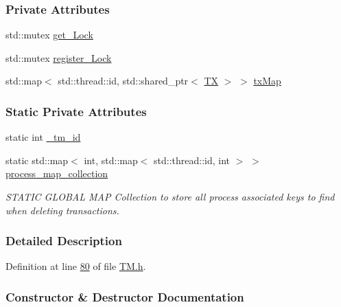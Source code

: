 \subsubsection*{Private Attributes}
\begin{DoxyCompactItemize}
\item 
std\+::mutex \hyperlink{class_t_m_a123bc5aa0766a7b909bebc54a429e5b0_a123bc5aa0766a7b909bebc54a429e5b0}{get\+\_\+\+Lock}
\item 
std\+::mutex \hyperlink{class_t_m_aeb26546681bfe64e21606b8c012bb8c3_aeb26546681bfe64e21606b8c012bb8c3}{register\+\_\+\+Lock}
\item 
std\+::map$<$ std\+::thread\+::id, std\+::shared\+\_\+ptr$<$ \hyperlink{class_t_x}{TX} $>$ $>$ \hyperlink{class_t_m_a0333dfa193ea99d7626de74a2b932e9b_a0333dfa193ea99d7626de74a2b932e9b}{tx\+Map}
\end{DoxyCompactItemize}
\subsubsection*{Static Private Attributes}
\begin{DoxyCompactItemize}
\item 
static int \hyperlink{class_t_m_a6fb90615393f9205838e302c714bbd60_a6fb90615393f9205838e302c714bbd60}{\+\_\+tm\+\_\+id}
\item 
static std\+::map$<$ int, std\+::map$<$ std\+::thread\+::id, int $>$ $>$ \hyperlink{class_t_m_a81c3bd28ad2343a620fa070f8ac186ca_a81c3bd28ad2343a620fa070f8ac186ca}{process\+\_\+map\+\_\+collection}
\begin{DoxyCompactList}\small\item\em S\+T\+A\+T\+IC G\+L\+O\+B\+AL M\+AP Collection to store all process associated keys to find when deleting transactions. \end{DoxyCompactList}\end{DoxyCompactItemize}


\subsubsection{Detailed Description}


Definition at line \hyperlink{_t_m_8h_source_l00080}{80} of file \hyperlink{_t_m_8h_source}{T\+M.\+h}.



\subsubsection{Constructor \& Destructor Documentation}
